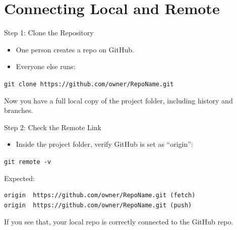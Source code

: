 \documentclass{beamer}
\begin{document}
\section{Connecting Local and Remote}

\begin{frame}{Step 1: Clone the Repository}
  \begin{itemize}
    \item One person creates a repo on GitHub.
    \item Everyone else runs:
  \end{itemize}

  \vspace{1mm}
  \texttt{git clone https://github.com/owner/RepoName.git}

  \vspace{2mm}
  Now you have a full local copy of the project folder, including history and branches.
\end{frame}

\begin{frame}[fragile]{Step 2: Check the Remote Link}
  \begin{itemize}
    \item Inside the project folder, verify GitHub is set as ``origin'':
  \end{itemize}

  \vspace{1mm}
  \texttt{git remote -v}

  \vspace{2mm}
  Expected:
  \begin{verbatim}
origin  https://github.com/owner/RepoName.git (fetch)
origin  https://github.com/owner/RepoName.git (push)
  \end{verbatim}

  \vspace{2mm}
  If you see that, your local repo is correctly connected to the GitHub repo.
\end{frame}
\end{document}
